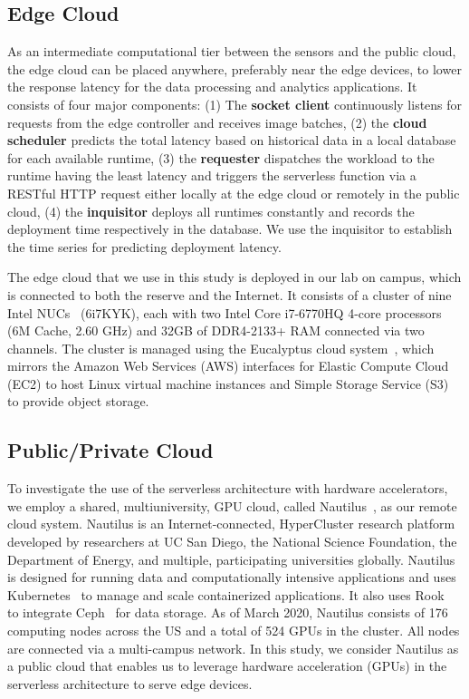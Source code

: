  \subsection{Edge Cloud}
As an intermediate computational tier between the sensors and the public cloud, the edge cloud can be placed anywhere, preferably near the edge devices, to lower the response latency for the data processing and analytics applications. It consists of four major components: (1) The \textbf{socket client} continuously listens for requests from the edge controller and receives image batches, (2) the \textbf{cloud scheduler} predicts the total latency based on historical data in a local database for each available runtime, (3) the \textbf{requester} dispatches the workload to the runtime having the least latency and triggers the  serverless function via a RESTful HTTP request either locally at the edge cloud or remotely in the public cloud, (4) the \textbf{inquisitor} deploys all runtimes constantly and records the deployment time respectively in the database. We use the inquisitor to establish the time series for predicting deployment latency.

The edge cloud that we use in this study is deployed 
in our lab on campus, which is connected to both the reserve and the Internet. It consists of a cluster of nine Intel NUCs~\cite{ref:nucs} (6i7KYK), each with two Intel Core i7-6770HQ 4-core processors (6M Cache, 2.60 GHz) and 32GB of DDR4-2133+ RAM connected via two channels. The cluster is managed using the Eucalyptus cloud system~\cite{ref:euca}, which mirrors the Amazon Web Services (AWS) interfaces for Elastic Compute Cloud (EC2) to host Linux virtual machine instances and Simple Storage Service (S3) to provide object storage.
 
 \subsection{Public/Private Cloud}

To investigate the use of the serverless architecture with hardware accelerators, we employ a shared, multiuniversity, GPU cloud, called  Nautilus~\cite{ref:nautilus}, as our remote cloud system. Nautilus is an Internet-connected, HyperCluster research platform developed by researchers at UC San Diego, the National Science Foundation, the Department of Energy, and multiple, participating universities globally.  Nautilus is designed for running data and computationally intensive applications and uses Kubernetes~\cite{ref:k8s} to manage and scale containerized applications. It also uses Rook~\cite{ref:rook} to integrate Ceph~\cite{ref:ceph} for data storage. As of March 2020, Nautilus consists of 176 computing nodes across the US and a total of 524 GPUs in the cluster. All nodes are connected via a multi-campus network. In this study, we consider Nautilus as a public cloud that enables us to leverage hardware acceleration (GPUs) in the serverless architecture to serve edge devices. 

